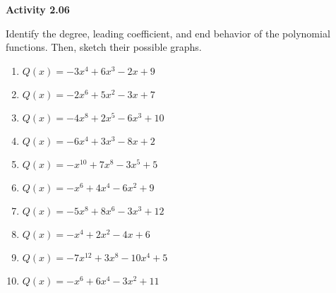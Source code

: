 \vspace{0.3ex}
\noindent\textbf{Activity 2.06}

\vspace{0.2ex}

Identify the degree, leading coefficient, and end behavior of the polynomial functions. Then, sketch their possible graphs.
\begin{multicols}{2}
\begin{enumerate}
    \item \( Q(x) = -3x^4 + 6x^3 - 2x + 9 \)
    \item \( Q(x) = -2x^6 + 5x^2 - 3x + 7 \)
    \item \( Q(x) = -4x^8 + 2x^5 - 6x^3 + 10 \)
    \item \( Q(x) = -6x^4 + 3x^3 - 8x + 2 \)
    \item \( Q(x) = -x^{10} + 7x^8 - 3x^5 + 5 \)
    \item \( Q(x) = -x^6 + 4x^4 - 6x^2 + 9 \)
    \item \( Q(x) = -5x^8 + 8x^6 - 3x^3 + 12 \)
    \item \( Q(x) = -x^4 + 2x^2 - 4x + 6 \)
    \item \( Q(x) = -7x^{12} + 3x^8 - 10x^4 + 5 \)
    \item \( Q(x) = -x^6 + 6x^4 - 3x^2 + 11 \)
\end{enumerate}
\end{multicols}
